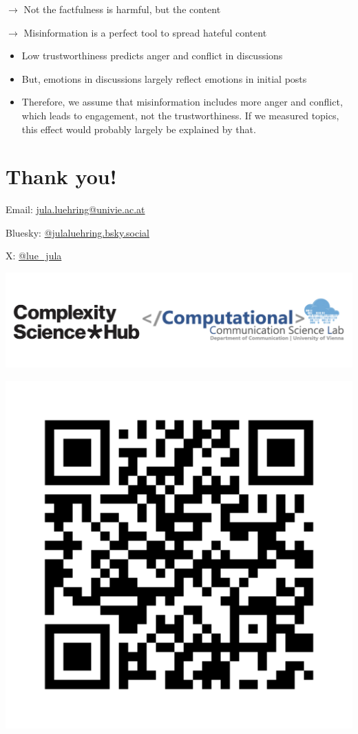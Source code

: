 \documentclass[
  letterpaper,
  DIV=11,
  numbers=noendperiod]{scrartcl}
\providecommand{\tightlist}{%
  \setlength{\itemsep}{0pt}\setlength{\parskip}{0pt}}\usepackage{longtable,booktabs,array}
\begin{document}
\(\rightarrow\) Not the factfulness is harmful, but the content

\(\rightarrow\) Misinformation is a perfect tool to spread hateful
content

\begin{itemize}
\tightlist
\item
  Low trustworthiness predicts anger and conflict in discussions
\item
  But, emotions in discussions largely reflect emotions in initial posts
\item
  Therefore, we assume that misinformation includes more anger and
  conflict, which leads to engagement, not the trustworthiness. If we
  measured topics, this effect would probably largely be explained by
  that.
\end{itemize}

\hypertarget{thank-you}{%
\section{Thank you!}\label{thank-you}}

Email: \url{jula.luehring@univie.ac.at}

Bluesky:
\href{https://bsky.app/profile/julaluehring.bsky.social}{@julaluehring.bsky.social}

X: \href{https://twitter.com/lue_jula}{@lue\_jula}

\includegraphics[width=6.25in,height=\textheight]{logos/logos-combined.png}

\includegraphics[width=6.25in,height=\textheight]{images/frame.png}
\end{document}
